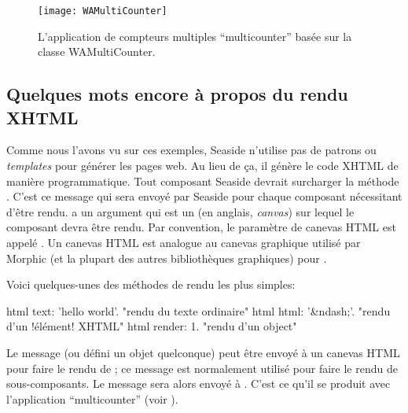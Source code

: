 \documentclass[a4paper,10pt,twoside]{book}
\begin{document}
\begin{figure}[bht]
\begin{center}
\texttt{[image: WAMultiCounter]}
\caption{L'application de compteurs multiples ``multicounter'' basée
  sur la classe WAMultiCounter.}
\end{center}
\end{figure}

\subsection{Quelques mots encore à propos du rendu XHTML}

Comme nous l'avons vu sur ces exemples, Seaside n'utilise pas de
patrons ou \emph{templates} pour générer les pages web.
Au lieu de ça, il génère le code XHTML de manière programmatique.
Tout composant Seaside devrait surcharger la méthode
 . C'est ce message qui sera
 envoyé par Seaside pour chaque composant nécessitant d'être rendu.
  a un argument qui est un
  
 (en anglais, \emph{canvas}) 
sur lequel le composant devra être rendu.
Par convention, le paramètre de canevas HTML est appelé 
 .
Un canevas HTML est analogue au canevas graphique utilisé par Morphic
(et la plupart des autres bibliothèques graphiques) pour
.
 
Voici quelques-unes des méthodes de rendu les plus simples:
\begin{code}{}
html text: 'hello world'.  "rendu du texte ordinaire"
html html: '&ndash;'.     "rendu d'un !élément! XHTML"
html render: 1.              "rendu d'un object"
\end{code}

Le message  
(ou  défini un objet quelconque)
peut être envoyé à un canevas HTML
pour faire le rendu de ; 
ce message est normalement utilisé pour faire le rendu de
sous-composants.
Le message  sera alors envoyé à .
C'est ce qu'il se produit avec l'application ``multicounter''
 (voir ).
\end{document}
